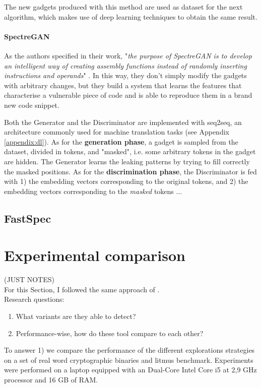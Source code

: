 \documentclass[12pt,a4paper]{book}
\theoremstyle{definition}
\begin{document}
	The new gadgets produced with this method are used as dataset for the next algorithm, which makes use of deep learning techniques to obtain the same result.
	\paragraph{SpectreGAN}
	As the authors specified in their work, "\textit{the purpose of SpectreGAN is to develop an intelligent way of creating assembly functions instead of randomly inserting instructions and operands}" \cite{Tol2021}. In this way, they don't simply modify the gadgets with arbitrary changes, but they build a system that learns the features that characterise a vulnerable piece of code and is able to reproduce them in a brand new code snippet.
	
	Both the Generator and the Discriminator are implemented with seq2seq, an architecture commonly used for machine translation tasks (see Appendix \ref{appendix:dl}). As for the \textbf{generation phase}, a gadget is sampled from the dataset, divided in tokens, and "masked", i.e. some arbitrary tokens in the gadget are hidden. The Generator learns the leaking patterns by trying to fill correctly the masked positions. As for the \textbf{discrimination phase}, the Discriminator is fed with 1) the embedding vectors corresponding to the original tokens, and 2) the embedding vectors corresponding to the \textit{masked} tokens ...
	\subsection{FastSpec}
	
	\section{Experimental comparison}
	(JUST NOTES)\\
	For this Section, I followed the same approach of \cite{Daniel2021}.\\
	Research questions:
	\begin{enumerate}
		\item What variants are they able to detect?
		\item Performance-wise, how do these tool compare to each other?
	\end{enumerate}
	To answer 1) we compare the performance of the different explorations strategies on a set of real word cryptographic binaries and litmus benchmark.
	Experiments were performed on a laptop equipped with an Dual-Core Intel Core i5 at 2,9 GHz processor and 16 GB of RAM.
	
\end{document}
